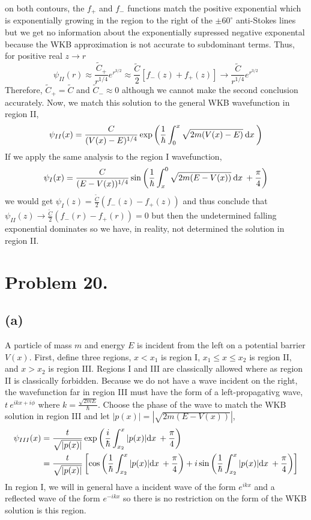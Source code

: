 \documentclass[12pt]{extarticle}
\begin{document}
on both contours, the $f_+$ and $f_{-}$ functions match the positive exponential which is exponentially growing in the region to the right of the $\pm 60^\circ$ anti-Stokes lines but we get no information about the exponentially supressed negative exponental because the WKB approximation is not accurate to subdominant terms. Thus, for positive real $z \rightarrow r$
\[\psi_{II}(r) \approx \frac{\tilde{C}_{+}}{r^{1/4}} e^{r^{3/2}} \approx \frac{\tilde{C}}{2} \left[f_{-}(z) + f_{+}(z) \right] \rightarrow \frac{\tilde{C}}{r^{1/4}} e^{r^{3/2}}\]
Therefore, $\tilde{C}_+ = \tilde{C}$ and $\tilde{C}_{-} \approx 0$ although we cannot make the second conclusion accurately. Now, we match this solution to the general WKB wavefunction in region II,
\[\psi_{II}(x) = \frac{C}{(V(x) - E)^{1/4}} \exp{\left(\frac{1}{\hbar} \int_0^{x} \sqrt{2m(V(x) - E)} \:  \mathrm{d}x \: \right)}\] 
If we apply the same analysis to the region I wavefunction,
\[\psi_I(x) = \frac{C}{(E - V(x))^{1/4}} \sin{\left(\frac{1}{\hbar} \int_x^0 \sqrt{2m(E - V(x))} \:  \mathrm{d}x \: + \frac{\pi}{4} \right)}\] 
we would get $\psi_I(z) = \frac{\tilde{C}}{2} (f_-(z) - f_+(z))$ and thus conclude that $\psi_{II}(z) \rightarrow \frac{\tilde{C}}{2} (f_-(r) - f_+(r)) = 0$ but then the undetermined falling exponential dominates so we have, in reality, not determined the solution in region II.  
\section{Problem 20.}
\subsection*{(a)}
A particle of mass $m$ and energy $E$ is incident from the left on a potential barrier $V(x)$. First, define three regions, $x < x_1$ is region I, $x_1 \le x \le x_2$ is region II, and $x > x_2$ is region III. Regions I and III are classically allowed where as region II is classically forbidden. Because we do not have a wave incident on the right, the wavefunction far in region III must have the form of a left-propagativg wave, $t \: e^{ikx + i\phi}$ where $k= \frac{\sqrt{2mE}}{\hbar}$. Choose the phase of the wave to match the WKB solution in region III and let $|p(x)| = |\sqrt{2m(E - V(x))}|$,
\begin{align*}
\psi_{III}(x) &= \frac{t}{\sqrt{|p(x)|}} \exp{\left(\frac{i}{\hbar} \int_{x_2}^x |p(x)|  \mathrm{d}x \: + \frac{\pi}{4} \right)} \\ &= \frac{t}{\sqrt{|p(x)|}} \left[ \cos{\left(\frac{1}{\hbar} \int_{x_2}^x |p(x)|  \mathrm{d}x \: + \frac{\pi}{4} \right)} + i \sin{\left(\frac{1}{\hbar} \int_{x_2}^x |p(x)|  \mathrm{d}x \: + \frac{\pi}{4} \right)} \right]  
\end{align*}
In region I, we will in general have a incident wave of the form $e^{ikx}$ and a reflected wave of the form $e^{-ikx}$ so there is no restriction on the form of the WKB solution is this region.
\end{document}
